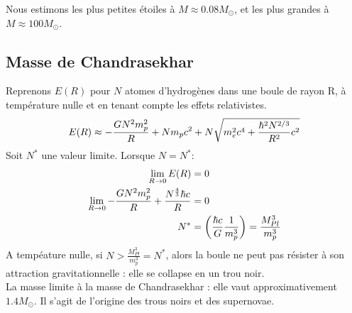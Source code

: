 \documentclass[../Notes de cours]{subfiles}
\begin{document}
Nous estimons les plus petites étoiles à $M \approx 0.08 M_\odot$, et les plus grandes à $M \approx 100 M_\odot$.


\subsection{Masse de Chandrasekhar}
Reprenons $E(R)$ pour $N$ atomes d'hydrogènes dans une boule de rayon R, à température nulle et en tenant compte les effets relativistes.
\begin{equation}
E(R) \approx - \frac{GN^2 m_p^2}{R} + N m_p c^2 + N \sqrt{m_e^2c^4 + \frac{\hbar^2N^{2/3}}{R^2}c^2}
\end{equation}
Soit $N^*$ une valeur limite. Lorsque $N = N^*$:
\begin{align}
\lim_{R\to 0} E(R) &= 0\\
\lim_{R\to 0} - \frac{GN^2 m_p^2}{R} + \frac{N^{\frac{4}{3}}\hbar c}{R} &= 0\\
N^* &= \left( \frac{\hbar c}{G} \frac{1}{m_p^3} \right) = \frac{M_{Pl}^3}{m_p^3}
\end{align}
A tempéature nulle, si $N > \frac{M_{Pl}^3}{m_p^3} = N^*$, alors la boule ne peut pas résister à son attraction gravitationnelle : elle se collapse en un trou noir.\\

La masse limite à la masse de Chandrasekhar : elle vaut approximativement $1.4 M_\odot$. Il s'agit de l'origine des trous noirs et des supernovae.
\end{document}
